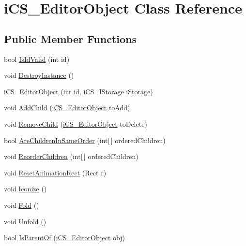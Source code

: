 \hypertarget{classi_c_s___editor_object}{\section{i\+C\+S\+\_\+\+Editor\+Object Class Reference}
\label{classi_c_s___editor_object}
}
\subsection*{Public Member Functions}
\begin{DoxyCompactItemize}
\item 
bool \hyperlink{classi_c_s___editor_object_a6336b5b7b199c7eeb01411d058af711d}{Is\+Id\+Valid} (int id)
\item 
void \hyperlink{classi_c_s___editor_object_a51a8c6e1fa92e48a07047cc0d9af8928}{Destroy\+Instance} ()
\item 
\hyperlink{classi_c_s___editor_object_a4906ca7fae66ab4ab23b3d55fa472bc2}{i\+C\+S\+\_\+\+Editor\+Object} (int id, \hyperlink{classi_c_s___i_storage}{i\+C\+S\+\_\+\+I\+Storage} i\+Storage)
\item 
void \hyperlink{classi_c_s___editor_object_addf9615bf31a47a8a50acfa814d1b1bd}{Add\+Child} (\hyperlink{classi_c_s___editor_object}{i\+C\+S\+\_\+\+Editor\+Object} to\+Add)
\item 
void \hyperlink{classi_c_s___editor_object_a04112a3c344720c0ec644620847bcc69}{Remove\+Child} (\hyperlink{classi_c_s___editor_object}{i\+C\+S\+\_\+\+Editor\+Object} to\+Delete)
\item 
bool \hyperlink{classi_c_s___editor_object_a0c94612776f0e5bab7ed1a0225c9c2fa}{Are\+Children\+In\+Same\+Order} (int\mbox{[}$\,$\mbox{]} ordered\+Children)
\item 
void \hyperlink{classi_c_s___editor_object_a75985201ca6c3ba7f406a2769ed8884a}{Reorder\+Children} (int\mbox{[}$\,$\mbox{]} ordered\+Children)
\item 
void \hyperlink{classi_c_s___editor_object_ab5d503c9a50b93874ab2b4ca659b6701}{Reset\+Animation\+Rect} (Rect r)
\item 
void \hyperlink{classi_c_s___editor_object_aaf5fade3cd6a6b0ad8606cc3d8d79a7e}{Iconize} ()
\item 
void \hyperlink{classi_c_s___editor_object_acdab03137434fde3dbf351ae26818449}{Fold} ()
\item 
void \hyperlink{classi_c_s___editor_object_adb07ea2867c63c9bc4e973677ddd642a}{Unfold} ()
\item 
bool \hyperlink{classi_c_s___editor_object_a4e1b1f98d18a833920ce98ce617b4a96}{Is\+Parent\+Of} (\hyperlink{classi_c_s___editor_object}{i\+C\+S\+\_\+\+Editor\+Object} obj)

\end{DoxyCompactItemize}

